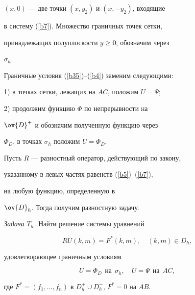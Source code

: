 $(x,0)$ --- две точки $(x,y_2)$ и $(x,-y_2)$, входящие


в систему (\ref{b7}). Множество граничных точек сетки,


принадлежащих полуплоскости $y \geq 0$, обозначим через


$\sigma_h$.





Граничные условия (\ref{b35})--(\ref{b4}) заменим следующими:





1) в точках сетки, лежащих на $AC$, положим $U=\Psi$;





2) продолжим функцию $\Phi$ по непрерывности на


$\ov{D}^+$ и обозначим полученную функцию через


$\Phi_D$, в точках $\sigma_h$ положим $U=\Phi_D$.





Пусть $R$ --- разностный оператор, действующий по закону,


указанному в левых частях равенств (\ref{b5})--(\ref{b7}),


на любую функцию, определенную в


$\ov{D}_h$. Тогда получим разностную задачу.


\smallskip





{\it Задача $T_h$.} Найти решение системы уравнений


\begin{equation}\label{b8}


RU(k,m)=F^*(k,m), \quad (k,m)\in D_h,


\end{equation}


удовлетворяющее граничным условиям


\begin{equation}\label{b8_1}


U=\Phi_D\ \ \text{на} \ \ \sigma_h,


\quad U=\Psi \ \ \text{на} \ \ AC,


\end{equation}


где $F^*=(f_1,\dotsc,f_n)$ в $D_h^+ \cup


D_h^-$, $F^*=0$ на $AB$.


